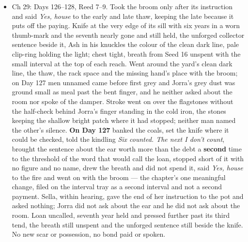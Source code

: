 \documentclass{design/chronicle}
\begin{document}
{\begin{itemize}[leftmargin=1.4em,itemsep=1pt,topsep=3pt,parsep=0pt]
\item Ch 29: Days 126–128, Reed 7–9. Took the broom only after its instruction and said \emph{Yes, house} to the early and late thaw, keeping the late because it puts off the paying. Knife at the very edge of its sill with six years in a worn thumb-mark and the seventh nearly gone and still held, the unforged collector sentence beside it, Ash in his knuckles the colour of the clean dark line, pale clip-ring holding the light; chest tight, breath from Seed 16 unspent with the small interval at the top of each reach. Went around the yard’s clean dark line, the thaw, the rack space and the missing hand’s place with the broom; on Day 127 men unnamed came before first grey and Jorra’s grey dust was ground small as meal past the bent finger, and he neither asked about the room nor spoke of the damper. Stroke went on over the flagstones without the half-check behind Jorra’s finger standing in the cold iron, the stones keeping the shallow bright patch where it had stopped; neither man named the other’s silence. \textbf{On Day 127} banked the coals, set the knife where it could be checked, told the kindling \emph{Six counted. The next I don’t count}, brought the sentence about the ear worth more than the debt a \textbf{second} time to the threshold of the word that would call the loan, stopped short of it with no figure and no name, drew the breath and did not spend it, said \emph{Yes, house} to the fire and went on with the broom — the chapter’s one meaningful change, filed on the interval tray as a second interval and not a second payment. Sella, within hearing, gave the end of her instruction to the pot and asked nothing; Jorra did not ask about the ear and he did not ask about the room. Loan uncalled, seventh year held and pressed further past its third tend, the breath still unspent and the unforged sentence still beside the knife. No new scar or possession, no bond paid or spoken.

\end{itemize}

\begin{itemize}[leftmargin=1.4em,itemsep=1pt,topsep=3pt,parsep=0pt]


\end{itemize}}
\end{document}
